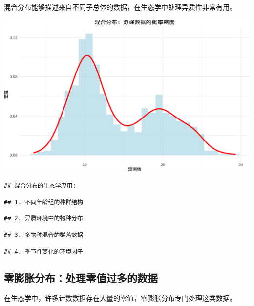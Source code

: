 \documentclass[
]{book}
\begin{document}
混合分布能够描述来自不同子总体的数据，在生态学中处理异质性非常有用。

\begin{center}\includegraphics[width=0.8\linewidth]{ecological-statistics_files/figure-latex/unnamed-chunk-34-1} \end{center}

\begin{verbatim}
## 混合分布的生态学应用:
\end{verbatim}

\begin{verbatim}
## 1. 不同年龄组的种群结构
\end{verbatim}

\begin{verbatim}
## 2. 异质环境中的物种分布
\end{verbatim}

\begin{verbatim}
## 3. 多物种混合的群落数据
\end{verbatim}

\begin{verbatim}
## 4. 季节性变化的环境因子
\end{verbatim}

\hypertarget{ux96f6ux81a8ux80c0ux5206ux5e03ux5904ux7406ux96f6ux503cux8fc7ux591aux7684ux6570ux636e}{%
\subsection{零膨胀分布：处理零值过多的数据}\label{ux96f6ux81a8ux80c0ux5206ux5e03ux5904ux7406ux96f6ux503cux8fc7ux591aux7684ux6570ux636e}}

在生态学中，许多计数数据存在大量的零值，零膨胀分布专门处理这类数据。
\end{document}
